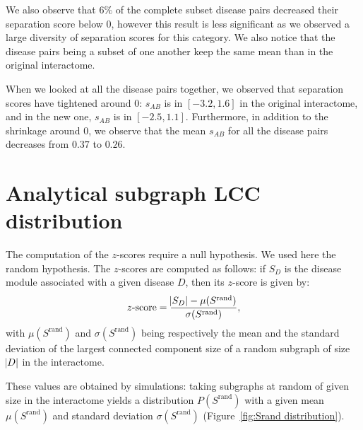 \documentclass[letterpaper]{article}
\begin{document}
	We also observe that $6\%$ of the complete subset disease pairs decreased their separation score below 0,
	however this result is less significant as we observed a large diversity of separation scores for this category.
	We also notice that the disease pairs being a subset of one another keep the same mean than in the
	original interactome.

	When we looked at all the disease pairs together, we observed that separation scores have tightened around 0:
	$s_{AB}$ is in $[-3.2, 1.6]$ in the original interactome, and in the new one, $s_{AB}$ is in $[-2.5, 1.1]$.
	Furthermore, in addition to the shrinkage around 0, we observe that the mean $s_{AB}$ for all the disease
	pairs decreases from $0.37$ to $0.26$.

\section{Analytical subgraph LCC distribution}\label{sec:z-score}
The computation of the $z$-scores require a null hypothesis. We used here the random hypothesis. The $z$-scores
are computed as follows: if $S_D$ is the disease module associated with a given disease $D$, then its
$z$-score is given by:
\begin{equation}
	z\text{-score} = \frac {\abs {S_D} - \mu(S^{\text{rand}})}{\sigma(S^{\text{rand}})},
\end{equation}
with $\mu(S^{\text{rand}})$ and $\sigma(S^{\text{rand}})$ being respectively the mean and the standard
deviation of the largest connected component size of a random subgraph of size $\abs D$ in the interactome.

These values are obtained by simulations: taking subgraphs at random of given size in the interactome yields a
distribution $P(S^{\text{rand}})$ with a given mean $\mu(S^{\text{rand}})$ and standard deviation
$\sigma(S^{\text{rand}})$ (Figure~\ref{fig:Srand distribution}).
\end{document}
